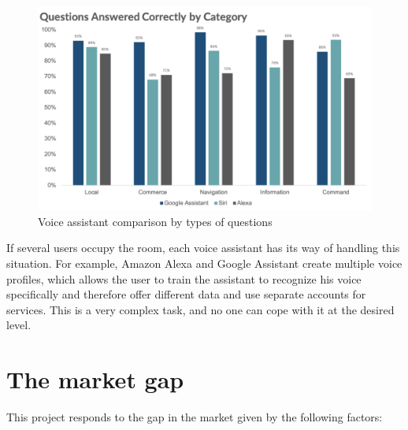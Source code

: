 \begin{figure}[H]
    \centering
    \includegraphics[width=\textwidth]{img/voice_assistant_comparison.png}
    \caption{Voice assistant comparison by types of questions \citep{voice_assistant_comparison_munster_2019}}
    \label{fig:voice_assistant_comparison}
\end{figure}

If several users occupy the room, each voice assistant has its way of handling this situation. For example, Amazon Alexa and Google Assistant create multiple voice profiles, which allows the user to train the assistant to recognize his voice specifically and therefore offer different data and use separate accounts for services. This is a very complex task, and no one can cope with it at the desired level.



\section{The market gap}

This project responds to the gap in the market given by the following factors:

